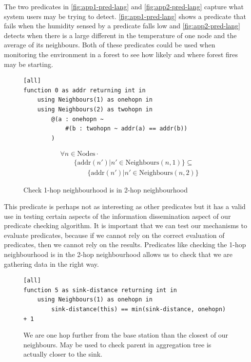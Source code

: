 The two predicates in \autoref{fig:app1-pred-lang} and \autoref{fig:app2-pred-lang} capture what system users may be trying to detect. \autoref{fig:app1-pred-lang} shows a predicate that fails when the humidity sensed by a predicate falls low and \autoref{fig:app2-pred-lang} detects when there is a large different in the temperature of one node and the average of its neighbours. Both of these predicates could be used when monitoring the environment in a forest to see how likely and where forest fires may be starting. 


\begin{figure}[H]
\begin{minipage}{.5\linewidth}
\begin{lstlisting}
[all]
function 0 as addr returning int in
    using Neighbours(1) as onehopn in
    using Neighbours(2) as twohopn in
        @(a : onehopn ~
            #(b : twohopn ~ addr(a) == addr(b))
        )
\end{lstlisting}
\end{minipage}%
\begin{minipage}{.5\linewidth}
\begin{align*}
&				\forall n \in \text{Nodes} \cdot \\
& \hspace{2em}		\{\text{addr}(n') | n' \in \text{Neighbours}(n, 1)\} \subseteq \\
& \hspace{4em}			\{\text{addr}(n') | n' \in \text{Neighbours}(n, 2)\}
\end{align*}
\end{minipage}
\caption{Check 1-hop neighbourhood is in 2-hop neighbourhood}
\end{figure}

This predicate is perhaps not as interesting as other predicates but it has a valid use in testing certain aspects of the information dissemination aspect of our predicate checking algorithm. It is important that we can test our mechanisms to evaluate predicates, because if we cannot rely on the correct evaluation of predicates, then we cannot rely on the results. Predicates like checking the 1-hop neighbourhood is in the 2-hop neighbourhood allows us to check that we are gathering data in the right way.


\begin{figure}[H]
\begin{lstlisting}
[all]
function 5 as sink-distance returning int in
    using Neighbours(1) as onehopn in
        sink-distance(this) == min(sink-distance, onehopn) + 1
\end{lstlisting}
\caption{We are one hop further from the base station than the closest of our neighbours. May be used to check parent in aggregation tree is actually closer to the sink.}
\label{fig:tree-agg-parent-hops-pred-lang}
\end{figure}

